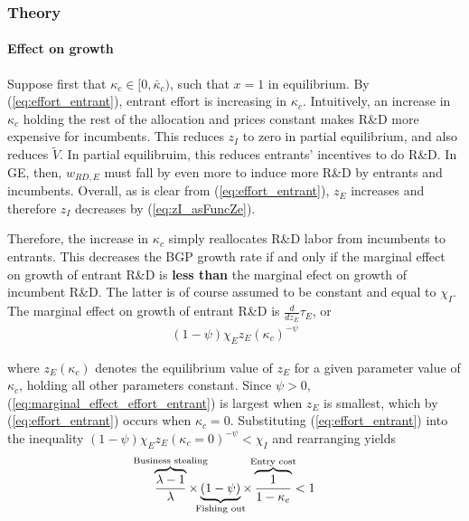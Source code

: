 \documentclass[11pt,english]{article}
\theoremstyle{remark}
\begin{document}
\subsubsection{Theory}

\paragraph{Effect on growth}

Suppose first that $\kappa_c \in [0, \bar{\kappa}_c)$, such that $x = 1$ in equilibrium. By (\ref{eq:effort_entrant}), entrant effort is increasing in $\kappa_c$. Intuitively, an increase in $\kappa_c$ holding the rest of the allocation and prices constant makes R\&D more expensive for incumbents. This reduces $z_I$ to zero in partial equilibrium, and also reduces $\tilde{V}$. In partial equilibruim, this reduces entrants' incentives to do R\&D. In GE, then, $w_{RD,E}$ must fall by even more to induce more R\&D by entrants and incumbents. Overall, as is clear from (\ref{eq:effort_entrant}), $z_E$ increases and therefore $z_I$ decreases by (\ref{eq:zI_asFuncZe}).

Therefore, the increase in $\kappa_c$ simply reallocates R\&D labor from incumbents to entrants. This decreases the BGP growth rate if and only if the marginal effect on growth of entrant R\&D is \textbf{less than} the marginal efect on growth of incumbent R\&D. The latter is of course assumed to be constant and equal to $\chi_I$. The marginal effect on growth of entrant R\&D is $\frac{d}{dz_E} \tau_E$, or
\begin{align}
(1-\psi) \chi_E z_E (\kappa_c)^{-\psi} \label{eq:marginal_effect_effort_entrant}
\end{align}

where $z_E(\kappa_c)$ denotes the equilibrium value of $z_E$ for a given parameter value of $\kappa_c$, holding all other parameters constant. Since $\psi > 0$, (\ref{eq:marginal_effect_effort_entrant}) is largest when $z_E$ is smallest, which by (\ref{eq:effort_entrant}) occurs when $\kappa_c = 0$. Substituting (\ref{eq:effort_entrant}) into the inequality $(1-\psi) \chi_E z_E(\kappa_c = 0)^{-\psi} < \chi_I$ and rearranging yields 
\begin{align}
\overbrace{\frac{\lambda-1}{\lambda}}^{\mathclap{\text{Business stealing}}} \times \underbrace{(1-\psi)}_{\mathclap{\text{Fishing out}}} \times  \overbrace{\frac{1}{1-\kappa_{e}}}^{\mathclap{\text{Entry cost}}}< 1 \label{cs:growth_decreasing_condition}
\end{align}
\end{document}
